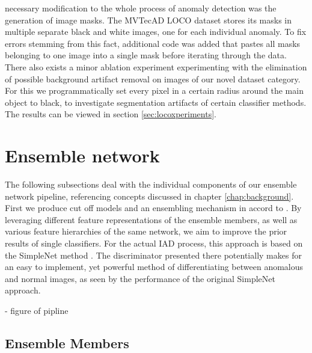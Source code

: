 necessary modification to the whole process of anomaly detection was the generation of image masks. The MVTecAD LOCO dataset stores its 
masks in multiple separate black and white images, one for each individual anomaly. To fix errors stemming from this fact, additional 
code was added that pastes all masks belonging to one image into a single mask before iterating through the data. 
There also exists a minor ablation experiment experimenting with the elimination 
of possible background artifact removal on images of our novel dataset category. For this we programmatically set every pixel in a certain radius around the main object to black, to investigate 
segmentation artifacts of certain classifier methods. The results can be viewed in section \ref{sec:locoxperiments}.




\section{Ensemble network}
\label{sec:ourensemblenetwork}


The following subsections deal with the individual components of our ensemble network pipeline, referencing concepts discussed in chapter \ref{chap:background}. First we produce cut off models 
and an ensembling mechanism in accord to \cite{EnsembleHeller2023}. By leveraging different feature representations of the ensemble 
members, as well as various feature hierarchies of the same network, we aim to improve the prior results of single classifiers.\newline 
For the actual IAD process, this approach is based on the SimpleNet method \cite{liu2023simplenet}. 
The discriminator presented there potentially makes for an easy to implement, yet powerful method of differentiating between anomalous and normal images, as seen by the performance of the original 
SimpleNet approach. 

- figure of pipline


\subsection{Ensemble Members}
\label{sec:ensemblecandidates}

